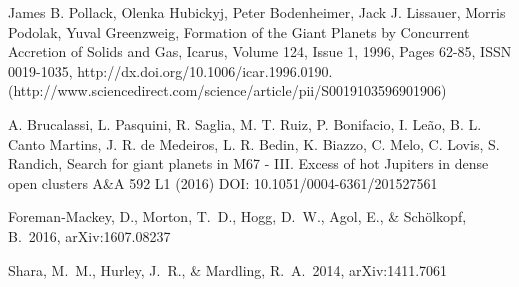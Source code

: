\documentclass[12pt]{article}
\begin{document}
\begin{thebibliography}{9}

James B. Pollack, Olenka Hubickyj, Peter Bodenheimer, Jack J. Lissauer, Morris Podolak, Yuval Greenzweig, Formation of the Giant Planets by Concurrent Accretion of Solids and Gas, Icarus, Volume 124, Issue 1, 1996, Pages 62-85, ISSN 0019-1035, http://dx.doi.org/10.1006/icar.1996.0190.
(http://www.sciencedirect.com/science/article/pii/S0019103596901906)

A.  Brucalassi, L.  Pasquini, R.  Saglia, M. T.  Ruiz, P.  Bonifacio, I.  Leão, B. L.  Canto Martins, J. R.  de Medeiros, L. R.  Bedin, K.  Biazzo, C.  Melo, C.  Lovis, S.  Randich,
Search for giant planets in M67 - III. Excess of hot Jupiters in dense open clusters
A\&A 592 L1 (2016)
DOI: 10.1051/0004-6361/201527561

Foreman-Mackey, D., Morton, T.~D., Hogg, D.~W., Agol, E., \& Sch{\"o}lkopf, B.\ 2016, arXiv:1607.08237 

 Shara, M.~M., Hurley, J.~R., \& Mardling, R.~A.\ 2014, arXiv:1411.7061 

%
%
%
%
%
\end{thebibliography}
\end{document}
